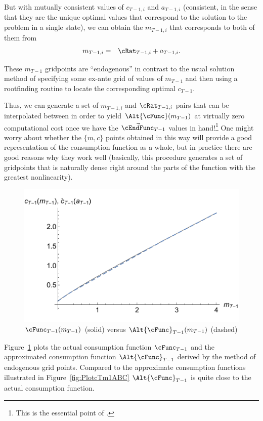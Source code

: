 \documentclass[titlepage]{\econtex}
\begin{document}
But with mutually consistent values of ${c}_{T-1,i}$ and ${a}_{T-1,i}$ (consistent, in the sense that they are the unique optimal
values that correspond to the solution to the problem in a single state), we can
obtain the ${m}_{T-1,i}$ that corresponds to both of them from
\begin{eqnarray}
  {m}_{T-1,i} & = & {\cRat}_{T-1,i}+{a}_{T-1,i}.
\end{eqnarray}

These ${m}_{T-1}$ gridpoints are ``endogenous'' in contrast to the usual solution method of
specifying some ex-ante grid of values of ${m}_{T-1}$ and then using a rootfinding
routine to locate the corresponding optimal ${c}_{T-1}$.

Thus, we can generate a set of ${m}_{T-1,i}$ and ${\cRat}_{T-1,i}$
pairs that can be interpolated between in order to yield
$\Alt{\cFunc}({m}_{T-1})$ at virtually zero computational cost once we
have the $\vec{\cEndFunc}_{T-1}$ values in hand!\footnote{This is
  the essential point of \cite{carrollEGM}.} One might worry
about whether the $\{{m},{c}\}$ points obtained in this way will provide a
good representation of the consumption function as a whole, but in
practice there are good reasons why they work well (basically, this
procedure generates a set of gridpoints that is naturally dense right
around the parts of the function with the greatest nonlinearity).
\hypertarget{PlotComparecTm1AD}{}
\begin{figure}
  \includegraphics{./Figures/PlotComparecTm1AD}
  \caption{$\cFunc_{T-1}({m}_{T-1})$ (solid) versus $\Alt{\cFunc}_{T-1}({m}_{T-1})$ (dashed)}
  \label{fig:ComparecTm1AD}
\end{figure}
Figure~\ref{fig:ComparecTm1AD} plots the actual consumption function
${\cFunc}_{T-1}$ and the approximated consumption function $\Alt{\cFunc}_{T-1}$
derived by the method of endogenous grid points. Compared to the approximate consumption
functions illustrated in Figure~\ref{fig:PlotcTm1ABC} $\Alt{\cFunc}_{T-1}$ is quite close
to the actual consumption function.
\end{document}
